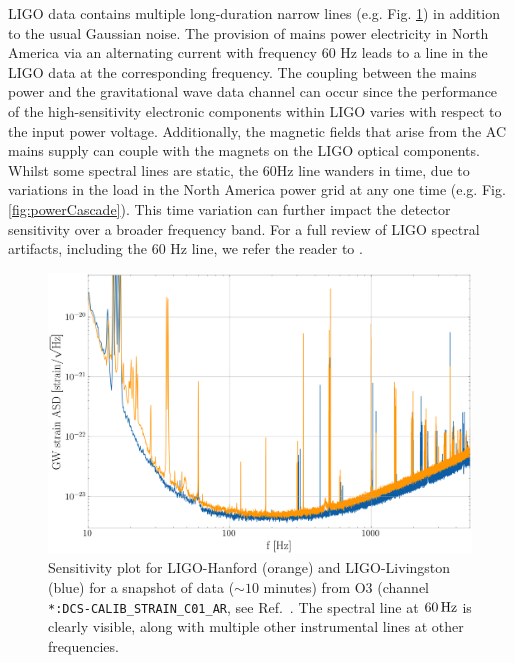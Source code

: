 \documentclass[pra,superscriptaddress,reprint,amsmath,amssymb,nofootinbib]{revtex4-2}
\begin{document}
LIGO data contains multiple long-duration narrow lines (e.g. Fig. \ref{fig:strainSensitivity}) in addition to the usual Gaussian noise. The provision of mains power electricity in North America via an alternating current with frequency 60 Hz leads to a line in the LIGO data at the corresponding frequency. The coupling between the mains power and the gravitational wave data channel can occur since the performance of the high-sensitivity electronic components within LIGO varies with respect to the input power voltage. Additionally, the magnetic fields that arise from the AC mains supply can couple with the magnets on the LIGO optical components. Whilst some spectral lines are static, the 60Hz line wanders in time, due to variations in the load in the North America power grid at any one time (e.g. Fig. \ref{fig:powerCascade}). This time variation can further impact the detector sensitivity over a broader frequency band. For a full review of LIGO spectral artifacts, including the 60 Hz line, we refer the reader to \cite{CovasEtAl:2018}.
\begin{figure}
	\begin{center}
		\includegraphics[width=\columnwidth]{images/sensitivity}
	\end{center}
	\caption{Sensitivity plot for LIGO-Hanford (orange) and LIGO-Livingston (blue) for a snapshot of data ($\sim 10$ minutes) from O3 (channel \texttt{*:DCS-CALIB\_STRAIN\_C01\_AR}, see Ref.~\cite{LIGO_O3, GWOSC:online}. The spectral line at $60\,{\rm Hz}$ is clearly visible, along with multiple other instrumental lines at other frequencies.}\label{fig:strainSensitivity}
\end{figure}
\end{document}
